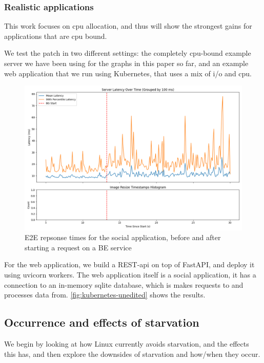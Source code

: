 \subsubsection{Realistic applications}

This work focuses on cpu allocation, and thus will show the strongest gains for
applications that are cpu bound. 

We test the patch in two different settings: the completely cpu-bound example
server we have been using for the graphs in this paper so far, and an example
web application that we run using Kubernetes, that uses a mix of i/o and cpu.

\begin{figure}[t]
    \centering
    \includegraphics[width=\columnwidth]{graphs/kubernetes-unedited.png}
    \caption{E2E repsonse times for the social application, before and after
    starting a request on a BE service}\label{fig:kubernetes-unedited}
\end{figure}

For the web application, we build a REST-api on top of FastAPI, and deploy it
using uvicorn workers. The web application itself is a social application, it
has a connection to an in-memory sqlite database, which is makes requests to and
processes data from. \autoref{fig:kubernetes-unedited} shows the results.

\subsection{Occurrence and effects of starvation}

We begin by looking at how Linux currently avoids starvation, and the effects
this has, and then explore the downsides of starvation and how/when they occur.

